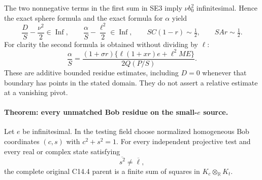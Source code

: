 The two nonnegative terms in the first sum in SE3 imply
$\nu b_0^2$ infinitesimal. Hence the exact sphere formula and the
exact formula for $\alpha$ yield
\[
 \frac DS-\frac{\nu^2}{2}\in\operatorname{Inf},\qquad
 \frac\alpha S-\frac{\ell^2}{2}\in\operatorname{Inf},\qquad
 SC(1-r)\sim\tfrac12,\qquad SAr\sim\tfrac12.\tag{SE8}
\]
For clarity the second formula is obtained without dividing by $\ell$:
\[
 \frac\alpha S=
 \frac{(1+\sigma r)\{\ell(1+xr)e+\ell^2ME\}}
      {2Q(P/S)}.\tag{SE9}
\]
These are additive bounded residue estimates, including $D=0$ whenever
that boundary has points in the stated domain. They do not assert a
relative estimate at a vanishing pivot.

\paragraph{Theorem: every unmatched Bob residue on the small-$e$ source.}
Let $e$ be infinitesimal. In the testing field choose normalized homogeneous
Bob coordinates $(c,s)$ with $c^2+s^2=1$. For every independent projective
test and every real or complex state satisfying
\[
                         \overline{s^2}\ne\overline\ell,\tag{SE10}
\]
the complete original C14.4 parent is a finite sum of squares in
$K_c\otimes_{\mathbb R}K_t$.

